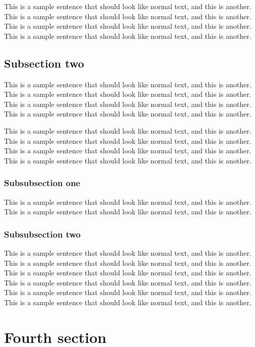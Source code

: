 This is a sample sentence that should look like normal text, and this
is another. This is a sample sentence that should look like normal
text, and this is another. This is a sample sentence that should look
like normal text, and this is another. This is a sample sentence that
should look like normal text, and this is another.

\subsection{Subsection two}

This is a sample sentence that should look like normal text, and this
is another. This is a sample sentence that should look like normal
text, and this is another. This is a sample sentence that should look
like normal text, and this is another. This is a sample sentence that
should look like normal text, and this is another.

This is a sample sentence that should look like normal text, and this
is another. This is a sample sentence that should look like normal
text, and this is another. This is a sample sentence that should look
like normal text, and this is another. This is a sample sentence that
should look like normal text, and this is another.

\subsubsection{Subsubsection one}

This is a sample sentence that should look like normal text, and this
is another. This is a sample sentence that should look like normal
text, and this is another.

\subsubsection{Subsubsection two}

This is a sample sentence that should look like normal text, and this
is another. This is a sample sentence that should look like normal
text, and this is another. This is a sample sentence that should look
like normal text, and this is another. This is a sample sentence that
should look like normal text, and this is another. This is a sample
sentence that should look like normal text, and this is another. This
is a sample sentence that should look like normal text, and this is
another.

\section{Fourth section}

